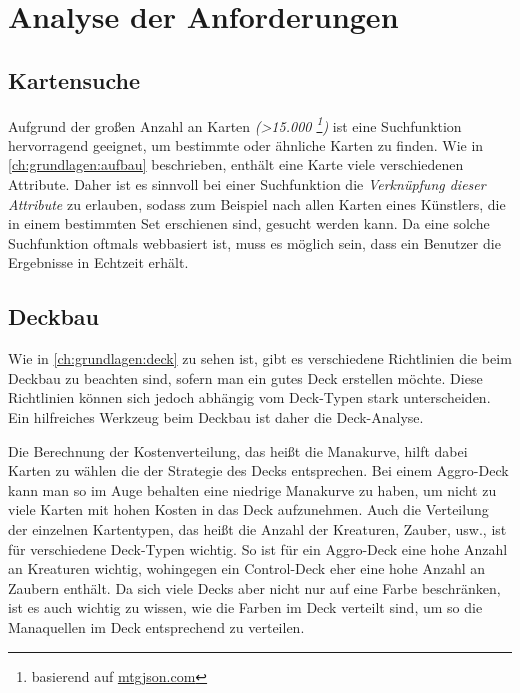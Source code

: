 \section{Analyse der Anforderungen}\label{ch:analyse}
\subsection{Kartensuche}
Aufgrund der großen Anzahl an Karten \emph{(>15.000 \footnote{basierend auf \url{mtgjson.com}})} ist eine Suchfunktion hervorragend geeignet, um bestimmte oder ähnliche Karten zu finden. Wie in \ref{ch:grundlagen:aufbau} beschrieben, enthält eine Karte viele verschiedenen Attribute. Daher ist es sinnvoll bei einer Suchfunktion die \emph{Verknüpfung dieser Attribute} zu erlauben, sodass zum Beispiel nach allen Karten eines Künstlers, die in einem bestimmten Set erschienen sind, gesucht werden kann. Da eine solche Suchfunktion oftmals webbasiert ist, muss es möglich sein, dass ein Benutzer die Ergebnisse in Echtzeit erhält.

\subsection{Deckbau}
Wie in \ref{ch:grundlagen:deck} zu sehen ist, gibt es verschiedene Richtlinien die beim Deckbau zu beachten sind, sofern man ein gutes Deck erstellen möchte. Diese Richtlinien können sich jedoch abhängig vom Deck-Typen stark unterscheiden. Ein hilfreiches Werkzeug beim Deckbau ist daher die Deck-Analyse.

Die Berechnung der Kostenverteilung, das heißt die Manakurve, hilft dabei Karten zu wählen die der Strategie des Decks entsprechen. Bei einem Aggro-Deck kann man so im Auge behalten eine niedrige Manakurve zu haben, um nicht zu viele Karten mit hohen Kosten in das Deck aufzunehmen. Auch die Verteilung der einzelnen Kartentypen, das heißt die Anzahl der Kreaturen, Zauber, usw., ist für verschiedene Deck-Typen wichtig. So ist für ein Aggro-Deck eine hohe Anzahl an Kreaturen wichtig, wohingegen ein Control-Deck eher eine hohe Anzahl an Zaubern enthält. Da sich viele Decks aber nicht nur auf eine Farbe beschränken, ist es auch wichtig zu wissen, wie die Farben im Deck verteilt sind, um so die Manaquellen im Deck entsprechend zu verteilen. 

